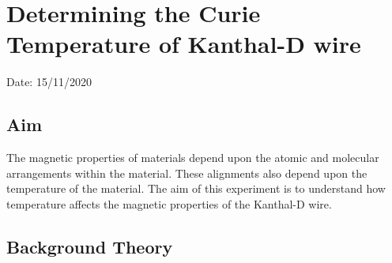 \chapter{Determining the Curie Temperature of Kanthal-D wire}

Date: 15/11/2020

\section{Aim}

The magnetic properties of materials depend upon the atomic and molecular arrangements within the material. These alignments also depend upon the temperature of the material. 
The aim of this experiment is to understand how temperature affects the magnetic properties of the Kanthal-D wire.


\section{Background Theory}

